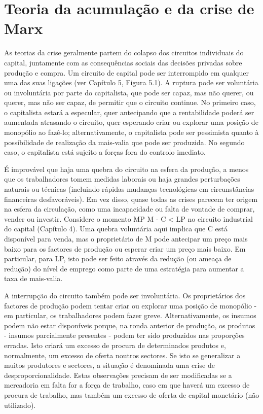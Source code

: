 \section{Teoria da acumulação e da crise de Marx}
 \par 
As teorias da crise geralmente partem do colapso dos circuitos individuais do capital, juntamente com as consequências sociais das decisões privadas sobre produção e compra. Um circuito de capital pode ser interrompido em qualquer uma das suas ligações (ver Capítulo 5, Figura {\color{blue}5}.1). A ruptura pode ser voluntária ou involuntária por parte do capitalista, que pode ser capaz, mas não querer, ou querer, mas não ser capaz, de permitir que o circuito continue. No primeiro caso, o capitalista estará a especular, quer antecipando que a rentabilidade poderá ser aumentada atrasando o circuito, quer esperando criar ou explorar uma posição de monopólio ao fazê-lo; alternativamente, o capitalista pode ser pessimista quanto à possibilidade de realização da mais-valia que pode ser produzida. No segundo caso, o capitalista está sujeito a forças fora do controlo imediato.
 \par 
É improvável que haja uma quebra do circuito na esfera da produção, a menos que os trabalhadores tomem medidas laborais ou haja grandes perturbações naturais ou técnicas (incluindo rápidas mudanças tecnológicas em circunstâncias financeiras desfavoráveis). Em vez disso, quase todas as crises parecem ter origem na esfera da circulação, como uma incapacidade ou falta de vontade de comprar, vender ou investir. Considere o momento MP M - C < LP no circuito industrial do capital (Capítulo {\color{blue}4}). Uma quebra voluntária aqui implica que C está disponível para venda, mas o proprietário de M pode antecipar um preço mais baixo para os factores de produção ou esperar criar um preço mais baixo. Em particular, para LP, isto pode ser feito através da redução (ou ameaça de redução) do nível de emprego como parte de uma estratégia para aumentar a taxa de mais-valia.
 \par 
A interrupção do circuito também pode ser involuntária. Os proprietários dos factores de produção podem tentar criar ou explorar uma posição de monopólio - em particular, os trabalhadores podem fazer greve. Alternativamente, os insumos podem não estar disponíveis porque, na ronda anterior de produção, os produtos - insumos parcialmente presentes - podem ter sido produzidos nas proporções erradas. Isto criará um excesso de procura de determinados produtos e, normalmente, um excesso de oferta noutros sectores. Se isto se generalizar a muitos produtores e sectores, a situação é denominada uma crise de desproporcionalidade. Estas observações precisam de ser modificadas se a mercadoria em falta for a força de trabalho, caso em que haverá um excesso de procura de trabalho, mas também um excesso de oferta de capital monetário (não utilizado).
